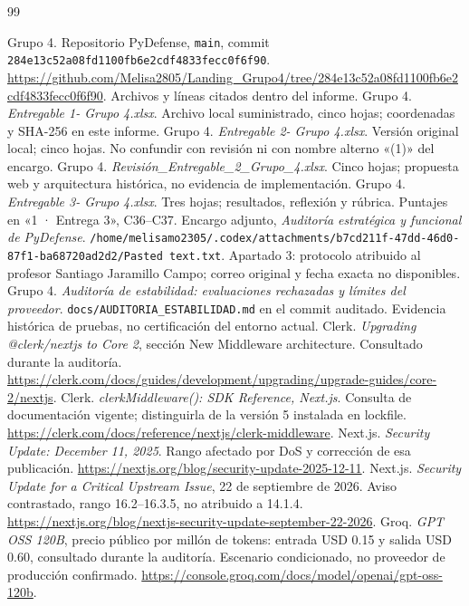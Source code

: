 \documentclass[11pt,a4paper]{report}
\begin{document}
\begin{thebibliography}{99}
 Grupo 4. Repositorio PyDefense, \texttt{main}, commit \nolinkurl{284e13c52a08fd1100fb6e2cdf4833fecc0f6f90}. \url{https://github.com/Melisa2805/Landing_Grupo4/tree/284e13c52a08fd1100fb6e2cdf4833fecc0f6f90}. Archivos y líneas citados dentro del informe.
 Grupo 4. \textit{Entregable 1- Grupo 4.xlsx}. Archivo local suministrado, cinco hojas; coordenadas y SHA-256 en este informe.
 Grupo 4. \textit{Entregable 2- Grupo 4.xlsx}. Versión original local; cinco hojas. No confundir con revisión ni con nombre alterno «(1)» del encargo.
 Grupo 4. \textit{Revisión\_Entregable\_2\_Grupo\_4.xlsx}. Cinco hojas; propuesta web y arquitectura histórica, no evidencia de implementación.
 Grupo 4. \textit{Entregable 3- Grupo 4.xlsx}. Tres hojas; resultados, reflexión y rúbrica. Puntajes en «1 · Entrega 3», C36--C37.
 Encargo adjunto, \textit{Auditoría estratégica y funcional de PyDefense}. \nolinkurl{/home/melisamo2305/.codex/attachments/b7cd211f-47dd-46d0-87f1-ba68720ad2d2/Pasted text.txt}. Apartado 3: protocolo atribuido al profesor Santiago Jaramillo Campo; correo original y fecha exacta no disponibles.
 Grupo 4. \textit{Auditoría de estabilidad: evaluaciones rechazadas y límites del proveedor}. \nolinkurl{docs/AUDITORIA_ESTABILIDAD.md} en el commit auditado. Evidencia histórica de pruebas, no certificación del entorno actual.
 Clerk. \textit{Upgrading @clerk/nextjs to Core 2}, sección New Middleware architecture. Consultado durante la auditoría. \url{https://clerk.com/docs/guides/development/upgrading/upgrade-guides/core-2/nextjs}.
 Clerk. \textit{clerkMiddleware(): SDK Reference, Next.js}. Consulta de documentación vigente; distinguirla de la versión 5 instalada en lockfile. \url{https://clerk.com/docs/reference/nextjs/clerk-middleware}.
 Next.js. \textit{Security Update: December 11, 2025}. Rango afectado por DoS y corrección de esa publicación. \url{https://nextjs.org/blog/security-update-2025-12-11}.
 Next.js. \textit{Security Update for a Critical Upstream Issue}, 22 de septiembre de 2026. Aviso contrastado, rango 16.2--16.3.5, no atribuido a 14.1.4. \url{https://nextjs.org/blog/nextjs-security-update-september-22-2026}.
 Groq. \textit{GPT OSS 120B}, precio público por millón de tokens: entrada USD 0.15 y salida USD 0.60, consultado durante la auditoría. Escenario condicionado, no proveedor de producción confirmado. \url{https://console.groq.com/docs/model/openai/gpt-oss-120b}.
\end{thebibliography}
\end{document}
